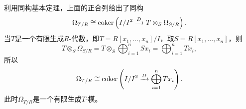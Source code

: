 利用同构基本定理，上面的正合列给出了同构
\[
	\Omega_{T/R}\cong \operatorname{coker}\left(I/I^2\xrightarrow{D} T\otimes_S\Omega_{S/R}\right).
\]
当$T$是一个有限生成$R$-代数，即$T=R[x_1,\dots,x_n]/I$，取$S=R[x_1,\dots,x_n]$，则
\[
	T\otimes_S\Omega_{S/R}=T\otimes_S\bigoplus_{i=1}^n Sx_i=\bigoplus_{i=1}^n Tx_i,
\]
所以
\[
	\Omega_{T/R}\cong \operatorname{coker}\left(I/I^2\xrightarrow{D} \bigoplus_{i=1}^n Tx_i\right),
\]
此时$\Omega_{T/R}$是一个有限生成$T$-模。